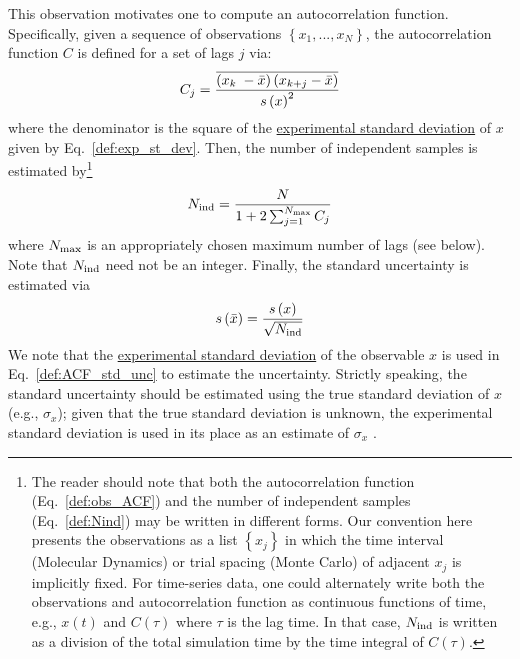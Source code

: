 This observation motivates one to compute an autocorrelation function.  Specifically, given a sequence of observations $\left\{x_1, ..., x_N\right\}$, the autocorrelation function $C$ is defined for a set of lags $j$ via:
%
\begin{equation}
  C_j = \dfrac{
   \overline{
      \left( x_{k{\color{white}j}}\hspace{-1pt} - \mean{x} \right)
      \left( x_{k+j} - \mean{x} \right)
    }
  }
  {\stdev{x}^2}
  \label{def:obs_ACF}
\end{equation}
%
where the denominator is the square of the \hyperref[def:exp_st_dev]{experimental standard deviation} of $x$ given by Eq.~\ref{def:exp_st_dev}.
Then, the number of independent samples is estimated by\footnote{The reader should note that both the autocorrelation function (Eq.~\ref{def:obs_ACF}) and the number of independent samples (Eq.~\ref{def:Nind}) may be written in different forms\cite{Grossfield2009,Chodera-2016}. Our convention here presents the observations as a list $\left\{x_j\right\}$ in which the time interval (Molecular Dynamics) or trial spacing (Monte Carlo) of adjacent $x_j$ is implicitly fixed. For time-series data, one could alternately write both the observations and autocorrelation function as continuous functions of time, e.g., $x\left(t\right)$ and $C\left(\tau\right)$ where $\tau$ is the lag time. In that case, $N_{\rm ind}$ is written as a division of the total simulation time by the time integral of $C\left(\tau\right)$\cite{Grossfield2009}.}
%
\begin{equation}
  N_{\rm ind} = \dfrac{N}{1+2 \sum_{j=1}^{N_{\rm max}} C_j}
  \label{def:Nind}
\end{equation}
%
where $N_{\rm max}$ is an appropriately chosen maximum number of lags (see below).  Note that $N_{\rm ind}$ need not be an integer.  Finally, the standard uncertainty is estimated via
%
\begin{equation}
  s\left( \bar{x} \right) = \dfrac{s\left( x \right)}{\sqrt{N_{\rm ind}}}
  \label{def:ACF_std_unc}
\end{equation}
%
We note that the \hyperref[def:exp_st_dev]{experimental standard deviation} of the observable $x$ is used in Eq.~\ref{def:ACF_std_unc} to estimate the uncertainty. Strictly speaking, the standard uncertainty should be estimated using the true standard deviation of $x$ (e.g., $\sigma_x$); given that the true standard deviation is unknown, the experimental standard deviation is used in its place as an estimate of $\sigma_x$ \cite{PatroneAIAA}.


